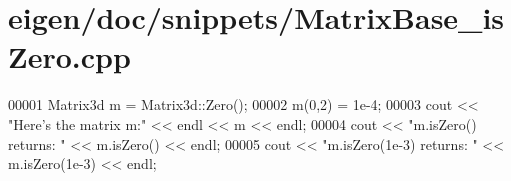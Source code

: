 \hypertarget{eigen_2doc_2snippets_2_matrix_base__is_zero_8cpp_source}{}\section{eigen/doc/snippets/\+Matrix\+Base\+\_\+is\+Zero.cpp}
\label{eigen_2doc_2snippets_2_matrix_base__is_zero_8cpp_source}

\begin{DoxyCode}
00001 Matrix3d m = Matrix3d::Zero();
00002 m(0,2) = 1e-4;
00003 cout << \textcolor{stringliteral}{"Here's the matrix m:"} << endl << m << endl;
00004 cout << \textcolor{stringliteral}{"m.isZero() returns: "} << m.isZero() << endl;
00005 cout << \textcolor{stringliteral}{"m.isZero(1e-3) returns: "} << m.isZero(1e-3) << endl;
\end{DoxyCode}
